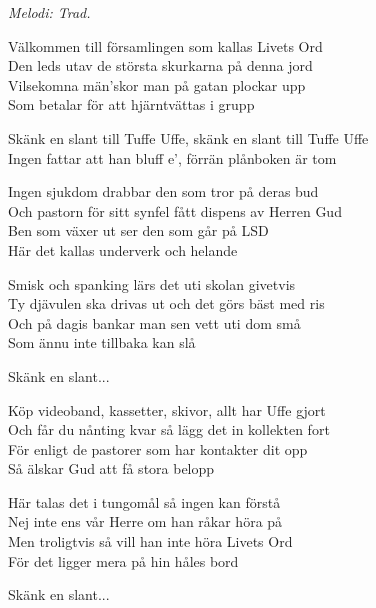 {\footnotesize\textit{Melodi: Trad.}}\par
\vspace{10pt}
Välkommen till församlingen som kallas Livets Ord\\
Den leds utav de största skurkarna på denna jord\\
Vilsekomna män’skor man på gatan plockar upp\\
Som betalar för att hjärntvättas i grupp\par
\vspace{9pt}
Skänk en slant till Tuffe Uffe, skänk en slant till Tuffe Uffe\\
Ingen fattar att han bluff e’, förrän plånboken är tom\par
\vspace{9pt}
Ingen sjukdom drabbar den som tror på deras bud\\
Och pastorn för sitt synfel fått dispens av Herren Gud\\
Ben som växer ut ser den som går på LSD\\
Här det kallas underverk och helande\par
\vspace{9pt}
Smisk och spanking lärs det uti skolan givetvis\\
Ty djävulen ska drivas ut och det görs bäst med ris\\
Och på dagis bankar man sen vett uti dom små\\
Som ännu inte tillbaka kan slå\par
\vspace{9pt}
Skänk en slant...\par
\vspace{9pt}
Köp videoband, kassetter, skivor, allt har Uffe gjort\\
Och får du nånting kvar så lägg det in kollekten fort\\
För enligt de pastorer som har kontakter dit opp\\
Så älskar Gud att få stora belopp\par
\vspace{9pt}
Här talas det i tungomål så ingen kan förstå\\
Nej inte ens vår Herre om han råkar höra på\\
Men troligtvis så vill han inte höra Livets Ord\\
För det ligger mera på hin håles bord\par
\newpage
Skänk en slant...\par
